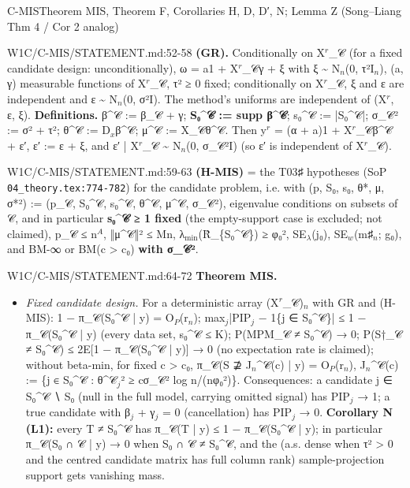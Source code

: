 \begin{card}{C-MIS}{Theorem MIS, Theorem F, Corollaries H, D, D′, N; Lemma Z (Song–Liang Thm 4 / Cor 2 analog)}
\begin{stmt}{W1C/C-MIS/STATEMENT.md:52-58}
\textbf{(GR).} Conditionally on X$^{r}$\_𝒞 (for a fixed candidate design: unconditionally), ω = a1 + X$^{r}$\_𝒞γ + ξ with
ξ \textasciitilde{} N$_{n}$(0, τ²I$_{n}$), (a, γ) measurable functions of X$^{r}$\_𝒞, τ² ≥ 0 fixed; conditionally on X$^{r}$\_𝒞, ξ and ε are independent
and ε \textasciitilde{} N$_{n}$(0, σ²I). The method's uniforms are independent of (X$^{r}$, ε, ξ).
\textbf{Definitions.} β\^{}𝒞 := β\_𝒞 + γ; \textbf{S₀\^{}𝒞 := supp β\^{}𝒞}; s₀\^{}𝒞 := |S₀\^{}𝒞|; σ\_𝒞² := σ² + τ²; θ\^{}𝒞 := D$_{x}$β\^{}𝒞; μ\^{}𝒞 := X\_𝒞θ\^{}𝒞.
Then y$^{r}$ = (α + a)1 + X$^{r}$\_𝒞β\^{}𝒞 + ε′, ε′ := ε + ξ, and ε′ | X$^{r}$\_𝒞 \textasciitilde{} N$_{n}$(0, σ\_𝒞²I) (so ε′ is independent of X$^{r}$\_𝒞).
\end{stmt}
\begin{stmt}{W1C/C-MIS/STATEMENT.md:59-63}
\textbf{(H-MIS)} = the T03♯ hypotheses (SoP \texttt{04\_theory.tex:774-782}) for the candidate problem, i.e. with
(p, S₀, s₀, θ*, μ, σ*²) := (p\_𝒞, S₀\^{}𝒞, s₀\^{}𝒞, θ\^{}𝒞, μ\^{}𝒞, σ\_𝒞²), eigenvalue conditions on subsets of 𝒞, and in particular
\textbf{s₀\^{}𝒞 ≥ 1 fixed} (the empty-support case is excluded; not claimed), p\_𝒞 ≤ n$^{A}$, ‖μ\^{}𝒞‖² ≤ Mn, λ$_{\mathrm{min}}$(R̂\_\{S₀\^{}𝒞\}) ≥ φ₀²,
SE$_{\lambda}$(j₀), SE$_{w}$(m♯$_{n}$; g₀), and BM-∞ or BM(c > c₀) \textbf{with σ\_𝒞²}.
\end{stmt}
\begin{stmt}{W1C/C-MIS/STATEMENT.md:64-72}
\textbf{Theorem MIS.}
\begin{itemize}
\item[(i)] \emph{Fixed candidate design.} For a deterministic array (X$^{r}$\_𝒞)$_{n}$ with GR and (H-MIS): 1 − π\_𝒞(S₀\^{}𝒞 | y) = O$_{P}$(r$_{n}$);
max$_{j}$|PIP$_{j}$ − 1\{j ∈ S₀\^{}𝒞\}| ≤ 1 − π\_𝒞(S₀\^{}𝒞 | y) (every data set, s₀\^{}𝒞 ≤ K); P(MPM\_𝒞 ≠ S₀\^{}𝒞) → 0;
P(S†\_𝒞 ≠ S₀\^{}𝒞) ≤ 2E[1 − π\_𝒞(S₀\^{}𝒞 | y)] → 0 (no expectation rate is claimed); without beta-min, for fixed c > c₀,
π\_𝒞(S ⊉ J$_{n}$\^{}𝒞(c) | y) = O$_{P}$(r$_{n}$), J$_{n}$\^{}𝒞(c) := \{j ∈ S₀\^{}𝒞 : θ\^{}𝒞$_{j}$² ≥ cσ\_𝒞² log n/(nφ₀²)\}.
Consequences: a candidate j ∈ S₀\^{}𝒞 ∖ S₀ (null in the full model, carrying omitted signal) has PIP$_{j}$ → 1; a true
candidate with β$_{j}$ + γ$_{j}$ = 0 (cancellation) has PIP$_{j}$ → 0. \textbf{Corollary N (L1):} every T ≠ S₀\^{}𝒞 has
π\_𝒞(T | y) ≤ 1 − π\_𝒞(S₀\^{}𝒞 | y); in particular π\_𝒞(S₀ ∩ 𝒞 | y) → 0 when S₀ ∩ 𝒞 ≠ S₀\^{}𝒞, and the (a.s. dense when
τ² > 0 and the centred candidate matrix has full column rank) sample-projection support gets vanishing mass.
\end{itemize}

\end{stmt}
\end{card}
